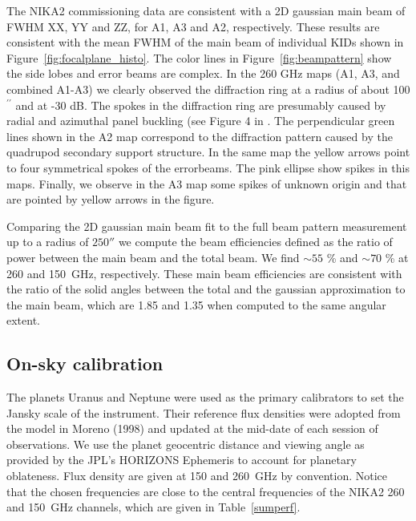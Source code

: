 \documentclass[]{aa} %
\begin{document}
The NIKA2 commissioning data are consistent with a 2D gaussian main beam of FWHM XX, YY and ZZ, for A1, A3 and A2, respectively. These results are consistent with the mean FWHM of the main beam of individual KIDs shown in Figure~\ref{fig:focalplane_histo}.
 The color lines in Figure~\ref{fig:beampattern} show the side lobes and error beams are complex. In the 260 GHz maps (A1, A3, and combined A1-A3) we clearly observed the diffraction ring at a radius of about 100$^{\prime \prime}$ and at -30 dB. The spokes in the diffraction ring are presumably caused by radial and azimuthal panel buckling (see Figure 4 in \cite{Greeve2010}. The perpendicular green lines shown in the A2 map correspond to the diffraction pattern caused by the quadrupod secondary support structure. In the same map the yellow arrows point to four symmetrical spokes of the errorbeams. The pink ellipse show spikes in this maps. Finally, we observe in the A3 map some spikes of unknown origin and that are pointed by yellow arrows in the figure.

Comparing the 2D gaussian main beam fit to the full beam pattern measurement up to a radius of
$250''$ we compute the beam efficiencies defined as the ratio of power between the main beam and the total beam. We find $\sim 55$ \% and $\sim 70$ \% at 260 and 150~GHz, respectively.
These main beam efficiencies are consistent with the ratio of the solid angles between the total and  the gaussian approximation to the main beam, which are 1.85 and 1.35 when computed to the same angular extent.

\subsection{On-sky calibration}
\label{On-sky calibration}

The planets Uranus and Neptune  were used as the primary calibrators to set the Jansky scale of the instrument.
Their reference flux densities were adopted from the model in Moreno (1998) 
and updated at the mid-date of each session of observations. We use the planet geocentric distance
and viewing angle as provided by the JPL's HORIZONS Ephemeris to account for planetary oblateness. 
Flux density are given at 150 and 260~GHz by convention. Notice that the chosen frequencies are close
to the central frequencies of the NIKA2 260 and 150~GHz channels, which are given in Table~\ref{sumperf}. \\
\end{document}
